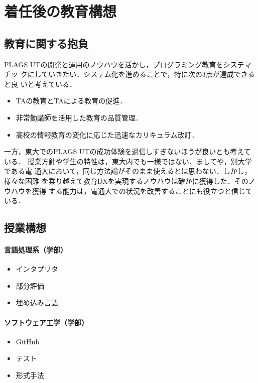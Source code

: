 \documentclass[dvipdfmx]{jsarticle}
\begin{document}
\section*{着任後の教育構想}

\subsection*{教育に関する抱負}

PLAGS UTの開発と運用のノウハウを活かし，プログラミング教育をシステマチッ
クにしていきたい．システム化を進めることで，特に次の3点が達成できると良
いと考えている．
\begin{itemize}
 \item TAの教育とTAによる教育の促進．

 \item 非常勤講師を活用した教育の品質管理．

 \item 高校の情報教育の変化に応じた迅速なカリキュラム改訂．
\end{itemize}

一方，東大でのPLAGS UTの成功体験を過信しすぎないほうが良いとも考えている．
授業方針や学生の特性は，東大内でも一様ではない．ましてや，別大学である電
通大において，同じ方法論がそのまま使えるとは思わない．しかし，様々な困難
を乗り越えて教育DXを実現するノウハウは確かに獲得した．そのノウハウを獲得
する能力は，電通大での状況を改善することにも役立つと信じている．

\subsection*{授業構想}

\paragraph{言語処理系（学部）}
\begin{itemize}
 \item インタプリタ
 \item 部分評価
 \item 埋め込み言語
\end{itemize}

\paragraph{ソフトウェア工学（学部）}
\begin{itemize}
 \item GitHub
 \item テスト
 \item 形式手法
\end{itemize}
\end{document}
